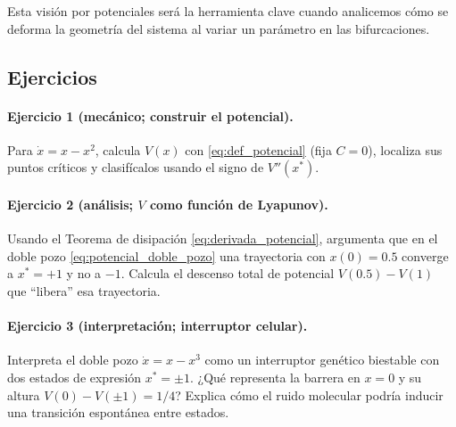 Esta visión por potenciales será la herramienta clave cuando analicemos cómo se deforma la geometría del sistema al variar un parámetro en las bifurcaciones.

\subsection{Ejercicios}

\paragraph{Ejercicio 1 (mecánico; construir el potencial).} Para $\dot{x} = x - x^2$, calcula $V(x)$ con \eqref{eq:def_potencial} (fija $C=0$), localiza sus puntos críticos y clasifícalos usando el signo de $V''(x^*)$.

\paragraph{Ejercicio 2 (análisis; $V$ como función de Lyapunov).} Usando el Teorema de disipación \eqref{eq:derivada_potencial}, argumenta que en el doble pozo \eqref{eq:potencial_doble_pozo} una trayectoria con $x(0)=0.5$ converge a $x^*=+1$ y no a $-1$. Calcula el descenso total de potencial $V(0.5)-V(1)$ que ``libera'' esa trayectoria.

\paragraph{Ejercicio 3 (interpretación; interruptor celular).} Interpreta el doble pozo $\dot{x}=x-x^3$ como un interruptor genético biestable con dos estados de expresión $x^*=\pm 1$. ¿Qué representa la barrera en $x=0$ y su altura $V(0)-V(\pm1)=1/4$? Explica cómo el ruido molecular podría inducir una transición espontánea entre estados.

